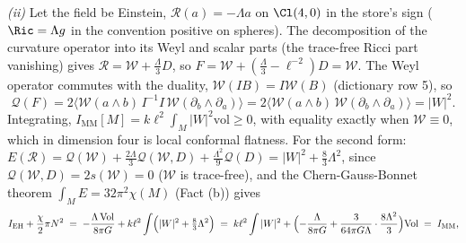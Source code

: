 \emph{(ii)} Let the field be Einstein, $\mathcal{R}(a) = -\Lambda a$ on $\Cl(4,0)$ in the store's sign ($\Ric = \Lambda g$ in the convention positive on spheres). The decomposition of the curvature operator into its Weyl and scalar parts (the trace-free Ricci part vanishing) gives $\mathcal{R} = \mathcal{W} + \tfrac{\Lambda}{3}D$, so $F = \mathcal{W} + (\tfrac{\Lambda}{3} - \ell^{-2})D = \mathcal{W}$. The Weyl operator commutes with the duality, $\mathcal{W}(IB) = I\mathcal{W}(B)$ (dictionary row 5), so
\[
\mathcal{Q}(F) = 2\langle\mathcal{W}(a\wedge b)\,I^{-1}I\,\mathcal{W}(\partial_{b}\wedge\partial_{a})\rangle = 2\langle\mathcal{W}(a\wedge b)\,\mathcal{W}(\partial_{b}\wedge\partial_{a})\rangle = |W|^{2} .
\]
Integrating, $I_{\mathrm{MM}}[M] = k\ell^{2}\int_{M}|W|^{2}\mathrm{vol} \ge 0$, with equality exactly when $\mathcal{W} \equiv 0$, which in dimension four is local conformal flatness. For the second form: $E(\mathcal{R}) = \mathcal{Q}(\mathcal{W}) + \tfrac{2\Lambda}{3}\mathcal{Q}(\mathcal{W}, D) + \tfrac{\Lambda^{2}}{9}\mathcal{Q}(D) = |W|^{2} + \tfrac83\Lambda^{2}$, since $\mathcal{Q}(\mathcal{W}, D) = 2s(\mathcal{W}) = 0$ ($\mathcal{W}$ is trace-free), and the Chern-Gauss-Bonnet theorem $\int_{M}E = 32\pi^{2}\chi(M)$ (Fact (b)) gives
\[
I_{\mathrm{EH}} + \frac{\chi}{2}\pi N^{2} \;=\; -\frac{\Lambda\,\mathrm{Vol}}{8\pi G} + k\ell^{2}\int\Bigl(|W|^{2} + \tfrac83\Lambda^{2}\Bigr) \;=\; k\ell^{2}\int|W|^{2} + \Bigl(-\frac{\Lambda}{8\pi G} + \frac{3}{64\pi G\Lambda}\cdot\frac{8\Lambda^{2}}{3}\Bigr)\mathrm{Vol} \;=\; I_{\mathrm{MM}},
\]
